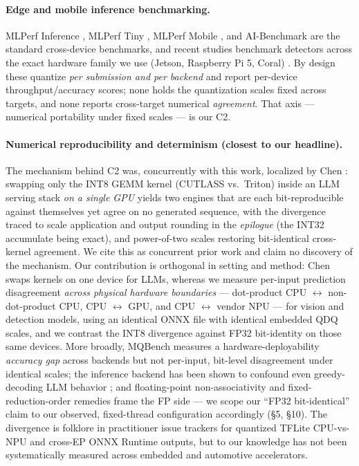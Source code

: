 \documentclass[11pt]{article}
\begin{document}
\paragraph{Edge and mobile inference benchmarking.}
MLPerf Inference \citep{reddi2020mlperf}, MLPerf Tiny \citep{banbury2021mlperftiny}, MLPerf Mobile \citep{reddi2020mobile}, and AI-Benchmark \citep{ignatov2018, ignatov2019} are the standard cross-device benchmarks, and recent studies benchmark detectors across the exact hardware family we use (Jetson, Raspberry Pi 5, Coral) \citep{edgedetection2024, millar2025}. By design these quantize \emph{per submission and per backend} and report per-device throughput/accuracy scores; none holds the quantization scales fixed across targets, and none reports cross-target numerical \emph{agreement}. That axis --- numerical portability under fixed scales --- is our C2.

\paragraph{Numerical reproducibility and determinism (closest to our headline).}
The mechanism behind C2 was, concurrently with this work, localized by Chen \citep{chen2026integeralibi, chen2026deterministic}: swapping only the INT8 GEMM kernel (CUTLASS vs.\ Triton) inside an LLM serving stack \emph{on a single GPU} yields two engines that are each bit-reproducible against themselves yet agree on no generated sequence, with the divergence traced to scale application and output rounding in the \emph{epilogue} (the INT32 accumulate being exact), and power-of-two scales restoring bit-identical cross-kernel agreement. We cite this as concurrent prior work and claim no discovery of the mechanism. Our contribution is orthogonal in setting and method: Chen swaps kernels on one device for LLMs, whereas we measure per-input prediction disagreement \emph{across physical hardware boundaries} --- dot-product CPU $\leftrightarrow$ non-dot-product CPU, CPU $\leftrightarrow$ GPU, and CPU $\leftrightarrow$ vendor NPU --- for vision and detection models, using an identical ONNX file with identical embedded QDQ scales, and we contrast the INT8 divergence against FP32 bit-identity on those same devices. More broadly, MQBench \citep{li2021mqbench} measures a hardware-deployability \emph{accuracy gap} across backends but not per-input, bit-level disagreement under identical scales; the inference backend has been shown to confound even greedy-decoding LLM behavior \citep{masoudian2026}; and floating-point non-associativity \citep{fpnonassoc2024} and fixed-reduction-order remedies \citep{repdl2025} frame the FP side --- we scope our ``FP32 bit-identical'' claim to our observed, fixed-thread configuration accordingly (\S5, \S10). The divergence is folklore in practitioner issue trackers for quantized TFLite CPU-vs-NPU and cross-EP ONNX Runtime outputs, but to our knowledge has not been systematically measured across embedded and automotive accelerators.
\end{document}
